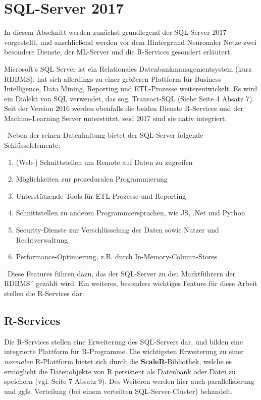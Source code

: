 \section{SQL-Server 2017}
\label{sec:SQLServer}
In diesem Abschnitt werden zunächst grundlegend der SQL-Server 2017 vorgestellt, und anschließend werden vor dem Hintergrund Neuronaler Netze zwei besondere Dienste, der ML-Server und die R-Services gesondert erläutert. 

Microsoft’s SQL Server ist ein Relationales Datenbankmanagementsystem (kurz RDBMS), hat sich allerdings zu einer größeren Plattform für Business Intelligence, Data Mining, Reporting und ETL-Prozesse weiterentwickelt. Es wird ein Dialekt von SQL verwendet, das sog. Transact-SQL (Siehe \cite{SQLData} Seite 4 Absatz 7). Seit der Version 2016 werden ebenfalls die beiden Dienste R-Services und der Machine-Learning Server unterstützt, seid 2017 sind sie nativ integriert. 

~\newline Neben der reinen Datenhaltung bietet der SQL-Server folgende Schlüsselelemente:
\begin{enumerate}
	\item (Web-) Schnittstellen um Remote auf Daten zu zugreifen
	\item Möglichkeiten zur prozeduralen Programmierung
	\item Unterstützende Tools für ETL-Prozesse und Reporting
	\item Schnittstellen zu anderen Programmiersprachen, wie JS, .Net und Python
	\item Security-Dienste zur Verschlüsselung der Daten sowie Nutzer und Rechtverwaltung
	\item Performance-Optimierung, z.B. durch In-Memory-Column-Stores
\end{enumerate}

~\newline Diese Features führen dazu, das der SQL-Server zu den Marktführern der RDBMS´ gezählt wird. Ein weiteres, besonders wichtiges Feature für diese Arbeit stellen die R-Services dar.
\subsection{R-Services}
Die R-Services stellen eine Erweiterung des SQL-Servers dar, und bilden eine integrierte Plattform für R-Programme. Die wichtigsten Erweiterung zu einer \textit{normalen} R-Plattform bietet sich durch die \textbf{ScaleR}-Bibliothek, welche es ermöglicht die Datenobjekte von R persistent als Datenbank oder Datei zu speichern (vgl. \cite{SQLData} Seite 7 Absatz 9). Des Weiteren werden hier auch parallelisierung und ggfs. Verteilung (bei einem verteilten SQL-Server-Cluster) behandelt.

